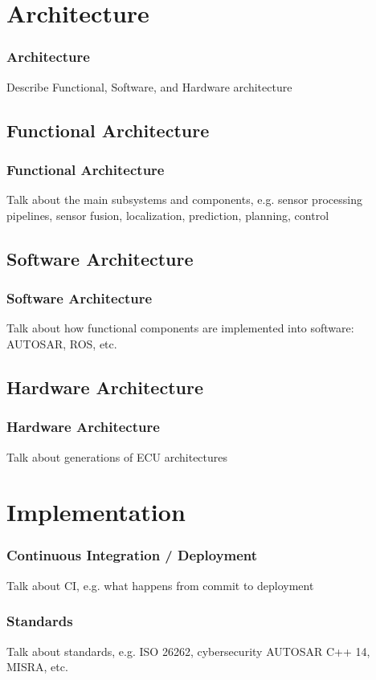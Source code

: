 \documentclass{beamer}
\begin{document}
\section{Architecture}

\begin{frame}
\frametitle{Architecture}
Describe Functional, Software, and Hardware architecture
\end{frame}

\subsection{Functional Architecture}

\begin{frame}
\frametitle{Functional Architecture}
Talk about the main subsystems and components, e.g. sensor processing pipelines,
sensor fusion, localization, prediction, planning, control
\end{frame}

\subsection{Software Architecture}

\begin{frame}
\frametitle{Software Architecture}
Talk about how functional components are implemented into software:
AUTOSAR, ROS, etc.
\end{frame}

\subsection{Hardware Architecture}

\begin{frame}
\frametitle{Hardware Architecture}
Talk about generations of ECU architectures
\end{frame}

\section{Implementation}

\begin{frame}
\frametitle{Continuous Integration / Deployment}
Talk about CI, e.g. what happens from commit to deployment
\end{frame}

\begin{frame}
\frametitle{Standards}
Talk about standards, e.g. ISO 26262, cybersecurity AUTOSAR C++ 14, MISRA, etc.
\end{frame}
\end{document}
